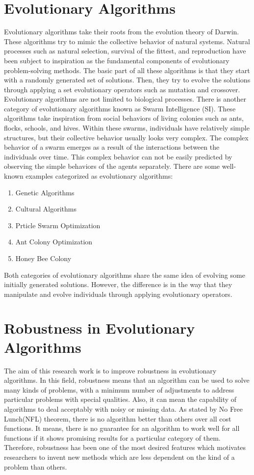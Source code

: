 	\section{Evolutionary Algorithms}
Evolutionary algorithms take their roots from the evolution theory of Darwin. These algorithms try to mimic the collective behavior of natural systems. Natural processes such as natural selection, survival of the fittest, and reproduction have been subject to inspiration as the fundamental components of evolutionary problem-solving methods. The basic part of all these algorithms is that they start with a randomly generated set of solutions. Then, they try to evolve the solutions through applying a set evolutionary operators such as mutation and crossover. \newline
Evolutionary algorithms are not limited to biological processes. There is another category of evolutionary algorithms known as Swarm Intelligence (SI). These algorithms take inspiration from social behaviors of living colonies such as ants, flocks, schools, and hives. Within these swarms, individuals have relatively simple structures, but their collective behavior usually looks very complex. The complex behavior of a swarm emerges as a result of the interactions between the individuals over time. This complex behavior can not be easily predicted by observing the simple behaviors of the agents separately. \newline
There are some well-known examples categorized as evolutionary algorithms:
\begin{enumerate}
	\item Genetic Algorithms
	\item Cultural Algorithms
	\item Prticle Swarm Optimization
	\item Ant Colony Optimization
	\item Honey Bee Colony
\end{enumerate}
Both categories of evolutionary algorithms share the same idea of evolving some initially generated solutions. However, the difference is in the way that they manipulate and evolve individuals through applying evolutionary operators. 
\section{Robustness in Evolutionary Algorithms}
The aim of this research work is to improve robustness in evolutionary algorithms.  In this field, robustness means that an algorithm can be used to solve many kinds of problems, with a minimum number of adjustments to address particular problems with special qualities. Also, it can mean the capability of algorithms to deal acceptably with noisy or missing data.\newline
As stated by No Free Lunch(NFL) theorem, there is no algorithm better than others over all cost functions. It means, there is no guarantee for an algorithm to work well for all functions if it shows promising results for a particular category of them. Therefore, robustness has been one of the most desired features which motivates researchers to invent new methods which are less dependent on the kind of a problem than others.\newline
